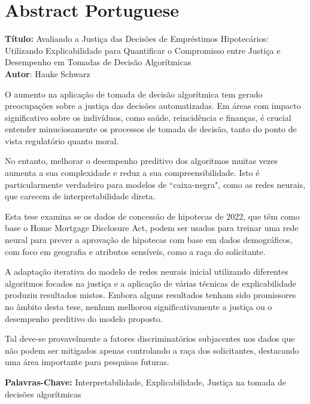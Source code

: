\chapter*{Abstract Portuguese}\label{abstractp}

\noindent
\textbf{Título:} Avaliando a Justiça das Decisões de Empréstimos Hipotecários: \\
Utilizando Explicabilidade para Quantificar o Compromisso entre Justiça e Desempenho em Tomadas de Decisão Algorítmicas\\
\textbf{Autor}: Hauke Schwarz
\vspace{1em}

O aumento na aplicação de tomada de decisão algorítmica tem gerado preocupações sobre a justiça das decisões automatizadas. Em áreas com impacto significativo sobre os indivíduos, como saúde, reincidência e finanças, é crucial entender minuciosamente os processos de tomada de decisão, tanto do ponto de vista regulatório quanto moral.

No entanto, melhorar o desempenho preditivo dos algoritmos muitas vezes aumenta a sua complexidade e reduz a sua compreensibilidade. Isto é particularmente verdadeiro para modelos de “caixa-negra", como as redes neurais, que carecem de interpretabilidade direta.

Esta tese examina se os dados de concessão de hipotecas de 2022, que têm como base o Home Mortgage Disclosure Act, podem ser usados para treinar uma rede neural para prever a aprovação de hipotecas com base em dados demográficos, com foco em geografia e atributos sensíveis, como a raça do solicitante.

A adaptação iterativa do modelo de redes neurais inicial utilizando diferentes algoritmos focados na justiça e a aplicação de várias técnicas de explicabilidade produziu resultados mistos. Embora alguns resultados tenham sido promissores no âmbito desta tese, nenhum melhorou significativamente a justiça ou o desempenho preditivo do modelo proposto.

Tal deve-se provavelmente a fatores discriminatórios subjacentes nos dados que não podem ser mitigados apenas controlando a raça dos solicitantes, destacando uma área importante para pesquisas futuras.

\vspace{3em}

\textbf{Palavras-Chave:} Interpretabilidade, Explicabilidade, Justiça na tomada de decisões algorítmicas \\